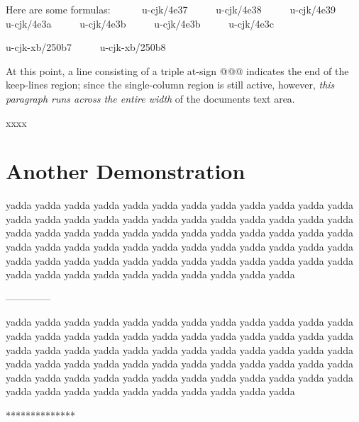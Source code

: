 Here are some formulas:
\begingroup{}     
{\mktsFontfileSourcecodeproregular{}u-cjk/4e37}     
{\mktsFontfileSourcecodeproregular{}u-cjk/4e38}     
{\mktsFontfileSourcecodeproregular{}u-cjk/4e39}     
{\mktsFontfileSourcecodeproregular{}u-cjk/4e3a}     
{\mktsFontfileSourcecodeproregular{}u-cjk/4e3b}     
{\mktsFontfileSourcecodeproregular{}u-cjk/4e3b}     
{\mktsFontfileSourcecodeproregular{}u-cjk/4e3c}     \par

{\mktsFontfileSourcecodeproregular{}u-cjk-xb/250b7}     
{\mktsFontfileSourcecodeproregular{}u-cjk-xb/250b8}     \par

\endgroup{}\par

At this point, a line consisting of a triple at-sign {\mktsFontfileSourcecodeproregular{}@@@}
indicates the end of the {\mktsFontfileSourcecodeproregular{}keep-lines} region; since the
{\mktsFontfileSourcecodeproregular{}single-column} region is still active, however, \textit{this
paragraph runs across the entire width} of the documents text
area.\par

xxxx\par

\par
\chapter{Another Demonstration
}


yadda yadda yadda yadda yadda yadda yadda yadda yadda yadda
yadda yadda yadda yadda yadda yadda yadda yadda yadda yadda
yadda yadda yadda yadda yadda yadda yadda yadda yadda yadda
yadda yadda yadda yadda yadda yadda yadda yadda yadda yadda
yadda yadda yadda yadda yadda yadda yadda yadda yadda yadda
yadda yadda yadda yadda yadda yadda yadda yadda yadda yadda
yadda yadda yadda yadda yadda yadda yadda yadda yadda yadda\par
--------------


yadda yadda yadda yadda yadda yadda yadda yadda yadda yadda
yadda yadda yadda yadda yadda yadda yadda yadda yadda yadda
yadda yadda yadda yadda yadda yadda yadda yadda yadda yadda
yadda yadda yadda yadda yadda yadda yadda yadda yadda yadda
yadda yadda yadda yadda yadda yadda yadda yadda yadda yadda
yadda yadda yadda yadda yadda yadda yadda yadda yadda yadda
yadda yadda yadda yadda yadda yadda yadda yadda yadda yadda\par
**************


